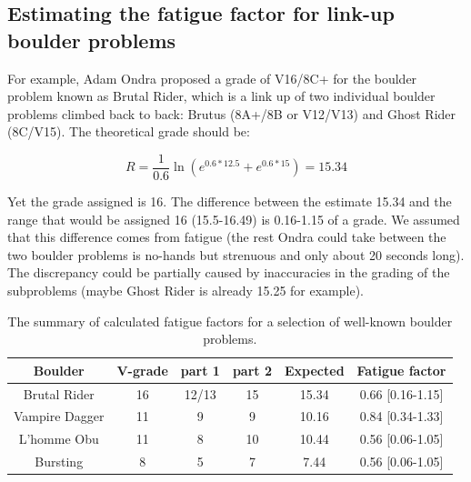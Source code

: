 \documentclass[11pt]{article}
\begin{document}
\subsection*{Estimating the fatigue factor for link-up boulder problems}


For example, Adam Ondra proposed a grade of V16/8C+ for the boulder problem known as Brutal Rider, which is a link up of two individual boulder problems climbed back to back: Brutus (8A+/8B or V12/V13) and Ghost Rider (8C/V15). The theoretical grade should be:

\begin{equation}
R = \frac{1}{0.6} \ln \left(e^{0.6 * 12.5} + e^{0.6*15}\right) = 15.34
\end{equation} 

Yet the grade assigned is 16. The difference between the estimate 15.34 and the range that would be assigned 16 (15.5-16.49)  is 0.16-1.15 of a grade. We assumed that this difference comes from fatigue (the rest Ondra could take between the two boulder problems is no-hands but strenuous and only about 20 seconds long). The discrepancy could be partially caused by inaccuracies in the grading of the subproblems (maybe Ghost Rider is already 15.25 for example).

\begin{table}
\centering
\begin{tabular}{| c | c | c | c | c | c |}
  \hline			
  {\bf Boulder } & {\bf V-grade} & {\bf part 1} & {\bf part 2} & {\bf Expected} & {\bf Fatigue factor } \\
  \hline			
  Brutal Rider & 16 & 12/13 & 15 & 15.34 & 0.66 [0.16-1.15]\\
  Vampire Dagger & 11 & 9 & 9 & 10.16 & 0.84 [0.34-1.33]\\
  L'homme Obu & 11 & 8 & 10 & 10.44 & 0.56 [0.06-1.05]\\
  Bursting & 8 & 5 & 7 & 7.44 & 0.56 [0.06-1.05]\\
  \hline  
\end{tabular}
\caption{The summary of calculated fatigue factors for a selection of well-known boulder problems. }
\label{table2}
\end{table}




\end{document}
